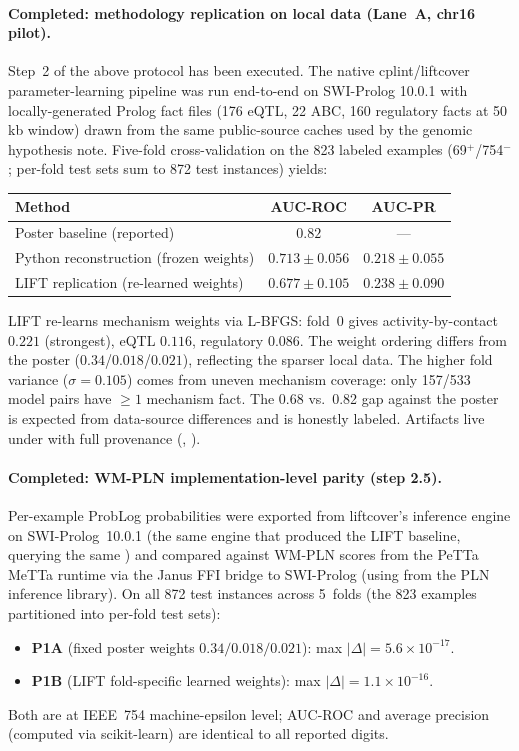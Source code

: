 \documentclass[11pt,openany]{report}
\begin{document}
\paragraph{Completed: methodology replication on local data (Lane~A, chr16 pilot).}
Step~2 of the above protocol has been executed.  The native cplint/liftcover
parameter-learning pipeline was run end-to-end on SWI-Prolog 10.0.1 with
locally-generated Prolog fact files (176 eQTL, 22 ABC, 160 regulatory facts
at 50\,kb window) drawn from the same public-source caches used by the genomic
hypothesis note.  Five-fold cross-validation on the 823 labeled examples
(69$^{+}$/754$^{-}$; per-fold test sets sum to 872 test instances) yields:
\begin{center}
\begin{tabular}{@{}lcc@{}}
\toprule
\textbf{Method} & \textbf{AUC-ROC} & \textbf{AUC-PR} \\
\midrule
Poster baseline (reported) & $0.82$ & --- \\
Python reconstruction (frozen weights) & $0.713 \pm 0.056$ & $0.218 \pm 0.055$ \\
LIFT replication (re-learned weights) & $0.677 \pm 0.105$ & $0.238 \pm 0.090$ \\
\bottomrule
\end{tabular}
\end{center}
\noindent
LIFT re-learns mechanism weights via L-BFGS: fold~0 gives
activity-by-contact $0.221$ (strongest), eQTL $0.116$, regulatory $0.086$.
The weight ordering differs from the poster ($0.34$/$0.018$/$0.021$),
reflecting the sparser local data.  The higher fold variance
($\sigma = 0.105$) comes from uneven mechanism coverage: only 157/533
model pairs have $\geq 1$ mechanism fact.  The 0.68 vs.\ 0.82 gap against
the poster is expected from data-source differences and is honestly labeled.
Artifacts live under  with full provenance
(,
).

\paragraph{Completed: WM-PLN implementation-level parity (step 2.5).}
Per-example ProbLog probabilities were exported from liftcover's
 inference engine on SWI-Prolog~10.0.1 (the same engine
that produced the LIFT baseline, querying the same
) and compared against WM-PLN scores
from the PeTTa MeTTa runtime via the Janus FFI bridge to SWI-Prolog
(using  from the PLN inference library).
On all 872 test instances across 5~folds (the 823 examples partitioned
into per-fold test sets):
\begin{itemize}
\item \textbf{P1A} (fixed poster weights $0.34/0.018/0.021$):
  max $|\Delta| = 5.6 \times 10^{-17}$.
\item \textbf{P1B} (LIFT fold-specific learned weights):
  max $|\Delta| = 1.1 \times 10^{-16}$.
\end{itemize}
Both are at IEEE~754 machine-epsilon level; AUC-ROC and average precision
(computed via scikit-learn) are identical to all reported digits.
\end{document}
